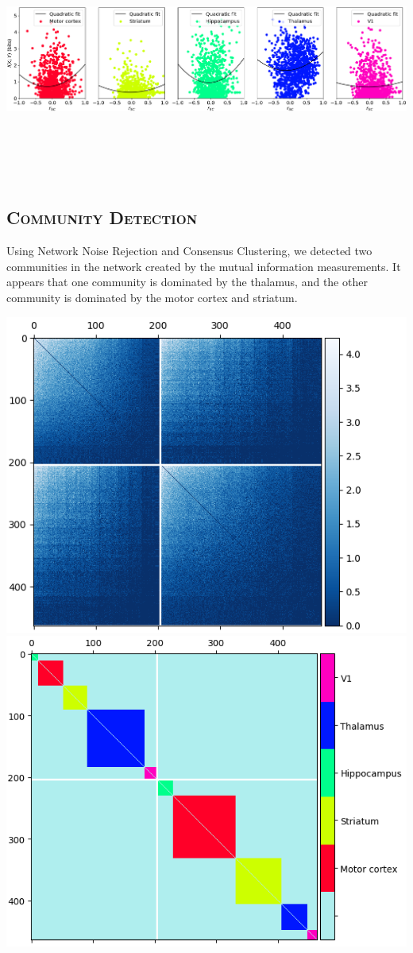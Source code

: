 \documentclass[a0,portrait]{a0poster}
\begin{document}
\begin{multicols}{2}
\includegraphics[width=\linewidth, height=8cm]{info_vs_corr.png}

\subsection*{\color{NavyBlue}\textsc{Community Detection}\color{Black}}

Using Network Noise Rejection and Consensus Clustering, we detected two communities in the network created by the mutual information measurements. It appears that one community is dominated by the thalamus, and the other community is dominated by the motor cortex and striatum.

\includegraphics[width=0.45\linewidth]{cons_cluster_map_all_good_15.png}
\includegraphics[width=0.45\linewidth]{regional_cluster_matrix.png}



\end{multicols}
\end{document}
